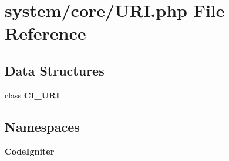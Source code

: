 \section{system/core/\-U\-R\-I.php File Reference}
\label{_u_r_i_8php}
\subsection*{Data Structures}
\begin{DoxyCompactItemize}
\item 
class {\bf C\-I\-\_\-\-U\-R\-I}
\end{DoxyCompactItemize}
\subsection*{Namespaces}
\begin{DoxyCompactItemize}
\item 
{\bf Code\-Igniter}
\end{DoxyCompactItemize}
